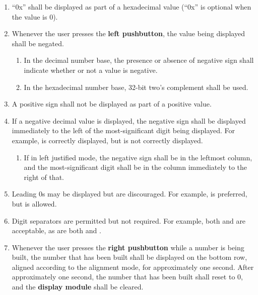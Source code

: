 \begin{enumerate}
\begin{enumerate}
\begin{enumerate}
            \end{enumerate}
        \item ``0x'' shall be displayed as part of a hexadecimal value (``0x'' is optional when the value is 0).
        \item Whenever the user presses the \textbf{left pushbutton}, the value
            being displayed shall be negated.
            \begin{enumerate}
                \item In the decimal number base, the presence or absence of negative sign shall indicate whether or not a value is negative.
                \item In the hexadecimal number base, 32-bit two's complement shall be used.
            \end{enumerate}
        \item A positive sign shall not be displayed as part of a positive value.
        \item If a negative decimal value is displayed, the negative sign shall be displayed immediately to the left of the most-significant digit being displayed.
            For example,  is correctly displayed, but  is not correctly displayed.
            \begin{enumerate}
                \item If in left justified mode, the negative sign shall be in the leftmost column, and the most-significant digit shall be in the column immediately to the right of that.
            \end{enumerate}
        \item Leading 0s may be displayed but are discouraged.
            For example,  is preferred, but  is allowed.
        \item Digit separators are permitted but not required.
            For example, both  and  are acceptable, as are both  and .
        \item \label{spec:clearNumber} Whenever the user presses the \textbf{right pushbutton} while a number is being built, the number that has been built shall be displayed on the bottom row, aligned according to the alignment mode, for approximately one second.
            After approximately one second, the number that has been built shall reset to 0, and the \textbf{display module} shall be cleared.

\end{enumerate}
\end{enumerate}
